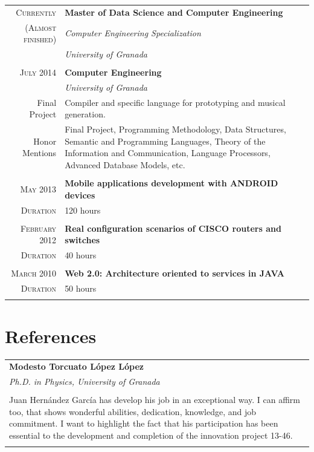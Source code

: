 \documentclass[a4paper,10pt]{article} %
\begin{document}
\begin{tabular}{r|p{11cm}}

\textsc{Currently} & \textbf{Master of Data Science and Computer Engineering} \\
\textsc{(Almost finished)} & \emph{Computer Engineering
Specialization}\\
& \emph{University of Granada} \\
\multicolumn{2}{c}{} \\

\textsc{July} 2014 & \textbf{Computer Engineering} \\
 & \emph{University of Granada}\\ 
 Final Project & Compiler and specific language for prototyping and musical
generation.\\ 
Honor Mentions & Final Project, Programming Methodology, Data Structures,
Semantic and Programming Languages, Theory of the Information and Communication, Language
Processors, Advanced Database Models, etc.\\
\multicolumn{2}{c}{} \\

\textsc{May} 2013 & \textbf{Mobile applications development with ANDROID
devices}\\
\textsc{Duration} & 120 hours \\
\multicolumn{2}{c}{} \\

\textsc{February} 2012 & \textbf{Real configuration scenarios of CISCO routers
and switches}\\
\textsc{Duration} & 40 hours \\
\multicolumn{2}{c}{} \\

\textsc{March} 2010 & \textbf{Web 2.0: Architecture oriented to services in
JAVA}\\
\textsc{Duration} & 50 hours\\
\multicolumn{2}{c}{} \\
\end{tabular}

\section{References}

\begin{tabular}{p{146mm}}

\textbf{Modesto Torcuato López López} \\
\emph{Ph.D. in Physics, University of Granada}\\ \\
Juan Hernández García has develop his job in an exceptional way. I can affirm
too, that shows wonderful abilities, dedication, knowledge, and job commitment.
I want to highlight the fact that his participation has been essential to the
development and completion of the innovation project 13-46. \\
\multicolumn{1}{c}{}
\end{tabular}
\end{document}
